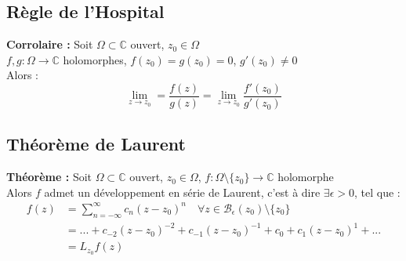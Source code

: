 \subsection{Règle de l'Hospital}
\textbf{Corrolaire :} Soit $\Omega\subset\mathbb{C}$ ouvert, $z_0\in\Omega$\\
$f,g : \Omega\to\mathbb{C}$ holomorphes, $f(z_0) = g(z_0) = 0$, $g'(z_0)\neq0$\\
Alors :
$$\lim_{z \to z_0} = \frac{f(z)}{g(z)} = \lim_{z \to z_0}\frac{f'(z_0)}{g'(z_0)}$$

\subsection{Théorème de Laurent}
\textbf{Théorème :} Soit $\Omega\subset\mathbb{C}$ ouvert, $z_0\in\Omega$, $f : \Omega\setminus\{z_0\}\to\mathbb{C}$ holomorphe\\
Alors $f$ admet un développement en série de Laurent, c'est à dire $\exists\epsilon>0$, tel que :
\begin{align*}
    f(z) &= \sum_{n=-\infty}^{\infty}c_n(z-z_0)^n \quad \forall z \in \mathcal{B}_\epsilon(z_0)\setminus\{z_0\} \\
    &=...+c_{-2}(z-z_0)^{-2}+c_{-1}(z-z_0)^{-1}+c_0+c_1(z-z_0)^1+... \\
    &= L_{z_0}f(z)
\end{align*}

